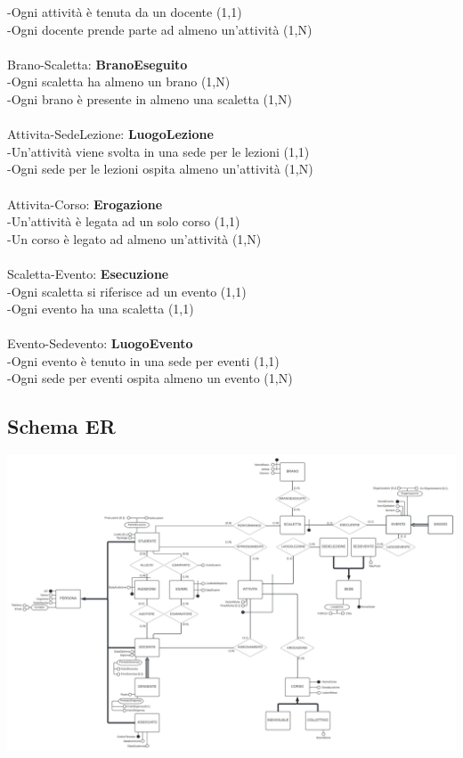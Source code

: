 \documentclass[11pt]{article}
\begin{document}
		-Ogni attività è tenuta da un docente (1,1)\\
		-Ogni docente prende parte ad almeno un'attività (1,N)\\
		\\
		Brano-Scaletta: \textbf{BranoEseguito}\\
		-Ogni scaletta ha almeno un brano (1,N)\\
		-Ogni brano è presente in almeno una scaletta (1,N)\\
		\\
		Attivita-SedeLezione: \textbf{LuogoLezione}\\
		-Un'attività viene svolta in una sede per le lezioni (1,1)\\
		-Ogni sede per le lezioni ospita almeno un'attività (1,N)\\
		\\
		Attivita-Corso: \textbf{Erogazione}\\
		-Un'attività è legata ad un solo corso (1,1)\\
		-Un corso è legato ad almeno un'attività (1,N)\\
		\\
		Scaletta-Evento: \textbf{Esecuzione}\\
		-Ogni scaletta si riferisce ad un evento (1,1)\\
		-Ogni evento ha una scaletta (1,1)\\
		\\
		Evento-Sedevento: \textbf{LuogoEvento}\\
		-Ogni evento è tenuto in una sede per eventi (1,1)\\
		-Ogni sede per eventi ospita almeno un evento (1,N)
	\subsection{Schema ER}
		\includegraphics[scale=0.6]{../SchemaConcettuale/ER-LUCIDCHART - ER-concettuale 1.jpeg}
\end{document}
